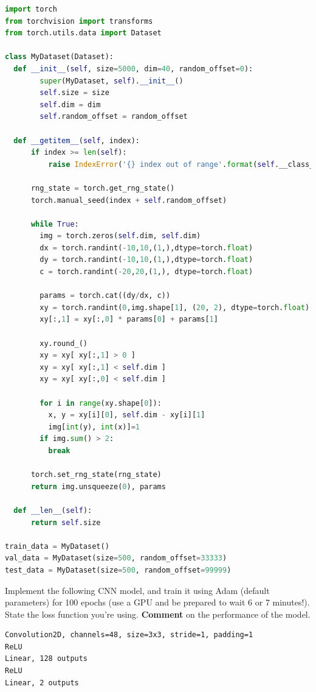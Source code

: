 \documentclass[a4paper]{article}
\begin{document}
\begin{lstlisting}[language=Python]
import torch
from torchvision import transforms
from torch.utils.data import Dataset

class MyDataset(Dataset):
  def __init__(self, size=5000, dim=40, random_offset=0):
        super(MyDataset, self).__init__()
        self.size = size
        self.dim = dim
        self.random_offset = random_offset

  def __getitem__(self, index):
      if index >= len(self):
          raise IndexError('{} index out of range'.format(self.__class__.__name__))
      
      rng_state = torch.get_rng_state()
      torch.manual_seed(index + self.random_offset)
      
      while True:
        img = torch.zeros(self.dim, self.dim)
        dx = torch.randint(-10,10,(1,),dtype=torch.float)
        dy = torch.randint(-10,10,(1,),dtype=torch.float)
        c = torch.randint(-20,20,(1,), dtype=torch.float)
        
        params = torch.cat((dy/dx, c))
        xy = torch.randint(0,img.shape[1], (20, 2), dtype=torch.float)
        xy[:,1] = xy[:,0] * params[0] + params[1]

        xy.round_()
        xy = xy[ xy[:,1] > 0 ]
        xy = xy[ xy[:,1] < self.dim ]
        xy = xy[ xy[:,0] < self.dim ]

        for i in range(xy.shape[0]):
          x, y = xy[i][0], self.dim - xy[i][1]
          img[int(y), int(x)]=1
        if img.sum() > 2:
          break

      torch.set_rng_state(rng_state)
      return img.unsqueeze(0), params

  def __len__(self):
      return self.size
  
train_data = MyDataset()
val_data = MyDataset(size=500, random_offset=33333)
test_data = MyDataset(size=500, random_offset=99999)
\end{lstlisting}

\begin{tcolorbox}[title=1.1 A simple CNN baseline (2 marks)]
Implement the following CNN model, and train it using Adam (default parameters) for 100 epochs (use a GPU and be prepared to wait 6 or 7 minutes!). State the loss function you're using. \textbf{Comment} on the performance of the model.

\begin{lstlisting}
Convolution2D, channels=48, size=3x3, stride=1, padding=1
ReLU
Linear, 128 outputs
ReLU
Linear, 2 outputs
\end{lstlisting}
\end{tcolorbox}
\end{document}
